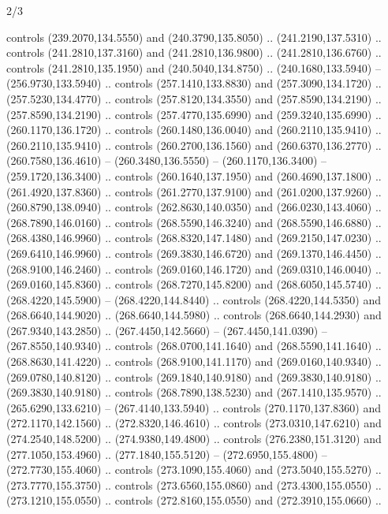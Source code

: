 \begin{flagdescription}{2/3}
\begin{scope}[xshift=0.5\flaglength,yshift=0.5\flagwidth,scale=\flagwidth/259.2]
\begin{scope}[y=0.8pt, x=0.8pt, yscale=-1,shift={(-243,-162)}]
      controls (239.2070,134.5550) and (240.3790,135.8050) .. (241.2190,137.5310) ..
      controls (241.2810,137.3160) and (241.2810,136.9800) .. (241.2810,136.6760) ..
      controls (241.2810,135.1950) and (240.5040,134.8750) .. (240.1680,133.5940) --
      (256.9730,133.5940) .. controls (257.1410,133.8830) and (257.3090,134.1720) ..
      (257.5230,134.4770) .. controls (257.8120,134.3550) and (257.8590,134.2190) ..
      (257.8590,134.2190) .. controls (257.4770,135.6990) and (259.3240,135.6990) ..
      (260.1170,136.1720) .. controls (260.1480,136.0040) and (260.2110,135.9410) ..
      (260.2110,135.9410) .. controls (260.2700,136.1560) and (260.6370,136.2770) ..
      (260.7580,136.4610) -- (260.3480,136.5550) -- (260.1170,136.3400) --
      (259.1720,136.3400) .. controls (260.1640,137.1950) and (260.4690,137.1800) ..
      (261.4920,137.8360) .. controls (261.2770,137.9100) and (261.0200,137.9260) ..
      (260.8790,138.0940) .. controls (262.8630,140.0350) and (266.0230,143.4060) ..
      (268.7890,146.0160) .. controls (268.5590,146.3240) and (268.5590,146.6880) ..
      (268.4380,146.9960) .. controls (268.8320,147.1480) and (269.2150,147.0230) ..
      (269.6410,146.9960) .. controls (269.3830,146.6720) and (269.1370,146.4450) ..
      (268.9100,146.2460) .. controls (269.0160,146.1720) and (269.0310,146.0040) ..
      (269.0160,145.8360) .. controls (268.7270,145.8200) and (268.6050,145.5740) ..
      (268.4220,145.5900) -- (268.4220,144.8440) .. controls (268.4220,144.5350) and
      (268.6640,144.9020) .. (268.6640,144.5980) .. controls (268.6640,144.2930) and
      (267.9340,143.2850) .. (267.4450,142.5660) -- (267.4450,141.0390) --
      (267.8550,140.9340) .. controls (268.0700,141.1640) and (268.5590,141.1640) ..
      (268.8630,141.4220) .. controls (268.9100,141.1170) and (269.0160,140.9340) ..
      (269.0780,140.8120) .. controls (269.1840,140.9180) and (269.3830,140.9180) ..
      (269.3830,140.9180) .. controls (268.7890,138.5230) and (267.1410,135.9570) ..
      (265.6290,133.6210) -- (267.4140,133.5940) .. controls (270.1170,137.8360) and
      (272.1170,142.1560) .. (272.8320,146.4610) .. controls (273.0310,147.6210) and
      (274.2540,148.5200) .. (274.9380,149.4800) .. controls (276.2380,151.3120) and
      (277.1050,153.4960) .. (277.1840,155.5120) -- (272.6950,155.4800) --
      (272.7730,155.4060) .. controls (273.1090,155.4060) and (273.5040,155.5270) ..
      (273.7770,155.3750) .. controls (273.6560,155.0860) and (273.4300,155.0550) ..
      (273.1210,155.0550) .. controls (272.8160,155.0550) and (272.3910,155.0660) ..

\end{scope}
\end{scope}
\end{flagdescription}
